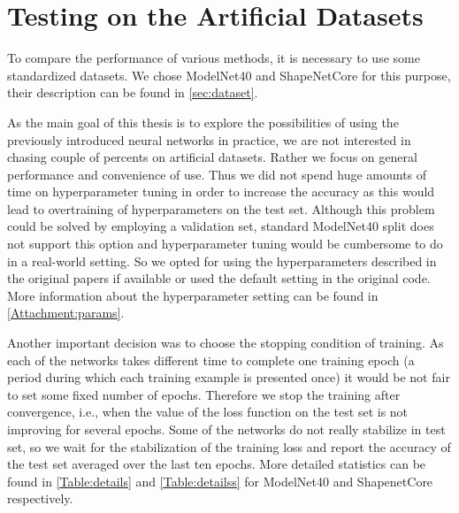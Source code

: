 \section{Testing on the Artificial Datasets}
To compare the performance of various methods, it is necessary to use some standardized datasets. We chose ModelNet40 and ShapeNetCore for this purpose, their description can be found in \autoref{sec:dataset}. \par
As the main goal of this thesis is to explore the possibilities of using the previously introduced neural networks in practice, we are not interested in chasing couple of percents on artificial datasets. Rather we focus on general performance and convenience of use. Thus we did not spend huge amounts of time on hyperparameter tuning in order to increase the accuracy as this would lead to overtraining of hyperparameters on the test set. Although this problem could be solved by employing a validation set, standard ModelNet40 split does not support this option and hyperparameter tuning would be cumbersome to do in a real-world setting. So we opted for using the hyperparameters described in the original papers if available or used the default setting in the original code. More information about the hyperparameter setting can be found in \autoref{Attachment:params}. \par
Another important decision was to choose the stopping condition of training. As each of the networks takes different time to complete one training epoch (a period during which each training example is presented once) it would be not fair to set some fixed number of epochs. Therefore we stop the training after convergence, i.e., when the value of the loss function on the test set is not improving for several epochs. Some of the networks do not really stabilize in test set, so we wait for the stabilization of the training loss and report the accuracy of the test set averaged over the last ten epochs. More detailed statistics can be found in \autoref{Table:details} and \autoref{Table:detailss} for ModelNet40 and ShapenetCore respectively.


